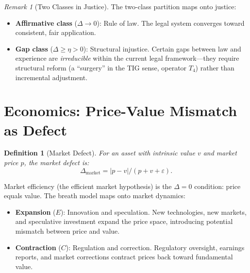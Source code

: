 \documentclass[12pt, openany]{book}
\newtheorem{definition}[theorem]{Definition}
\theoremstyle{remark}
\newtheorem{remark}[theorem]{Remark}
\begin{document}
\begin{remark}[Two Classes in Justice]
The two-class partition maps onto justice:
\begin{itemize}
  \item \textbf{Affirmative class} ($\Delta \to 0$): Rule of law.  The legal system
        converges toward consistent, fair application.
  \item \textbf{Gap class} ($\Delta \geq \eta > 0$): Structural injustice.  Certain
        gaps between law and experience are \emph{irreducible} within the current
        legal framework---they require structural reform (a ``surgery'' in the
        TIG sense, operator $T_4$) rather than incremental adjustment.
\end{itemize}
\end{remark}


\section{Economics: Price-Value Mismatch as Defect}
\label{sec:economics}

\begin{definition}[Market Defect]
\label{def:market-defect}
For an asset with intrinsic value $v$ and market price $p$, the market defect is:
\[
  \Delta_{\mathrm{market}} = |p - v| / (p + v + \varepsilon).
\]
\end{definition}

\noindent
Market efficiency (the efficient market hypothesis) is the $\Delta = 0$ condition:
price equals value.  The breath model maps onto market dynamics:
\begin{itemize}
  \item \textbf{Expansion} ($E$): Innovation and speculation.  New technologies,
        new markets, and speculative investment expand the price space, introducing
        potential mismatch between price and value.
  \item \textbf{Contraction} ($C$): Regulation and correction.  Regulatory oversight,
        earnings reports, and market corrections contract prices back toward
        fundamental value.
\end{itemize}
\end{document}
